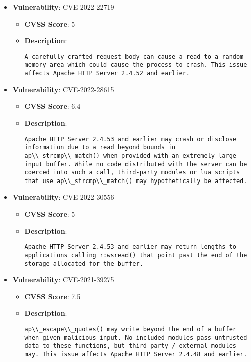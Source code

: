 \documentclass{article}
\begin{document}
\begin{itemize}
        \item \textbf{Vulnerability}: CVE-2022-22719
        \begin{itemize}
            \item \textbf{CVSS Score}:  5 
            \item \textbf{Description}:
            \parbox[t]{0.9\linewidth}{
                \verb|A carefully crafted request body can cause a read to a random memory area which could cause the process to crash. This issue affects Apache HTTP Server 2.4.52 and earlier.|
            }
        \end{itemize}
    
        \item \textbf{Vulnerability}: CVE-2022-28615
        \begin{itemize}
            \item \textbf{CVSS Score}:  6.4 
            \item \textbf{Description}:
            \parbox[t]{0.9\linewidth}{
                \verb|Apache HTTP Server 2.4.53 and earlier may crash or disclose information due to a read beyond bounds in ap\\_strcmp\\_match() when provided with an extremely large input buffer. While no code distributed with the server can be coerced into such a call, third-party modules or lua scripts that use ap\\_strcmp\\_match() may hypothetically be affected.|
            }
        \end{itemize}
    
        \item \textbf{Vulnerability}: CVE-2022-30556
        \begin{itemize}
            \item \textbf{CVSS Score}:  5 
            \item \textbf{Description}:
            \parbox[t]{0.9\linewidth}{
                \verb|Apache HTTP Server 2.4.53 and earlier may return lengths to applications calling r:wsread() that point past the end of the storage allocated for the buffer.|
            }
        \end{itemize}
    
        \item \textbf{Vulnerability}: CVE-2021-39275
        \begin{itemize}
            \item \textbf{CVSS Score}:  7.5 
            \item \textbf{Description}:
            \parbox[t]{0.9\linewidth}{
                \verb|ap\\_escape\\_quotes() may write beyond the end of a buffer when given malicious input. No included modules pass untrusted data to these functions, but third-party / external modules may. This issue affects Apache HTTP Server 2.4.48 and earlier.|
            }
        \end{itemize}
    
\end{itemize}
\end{document}
